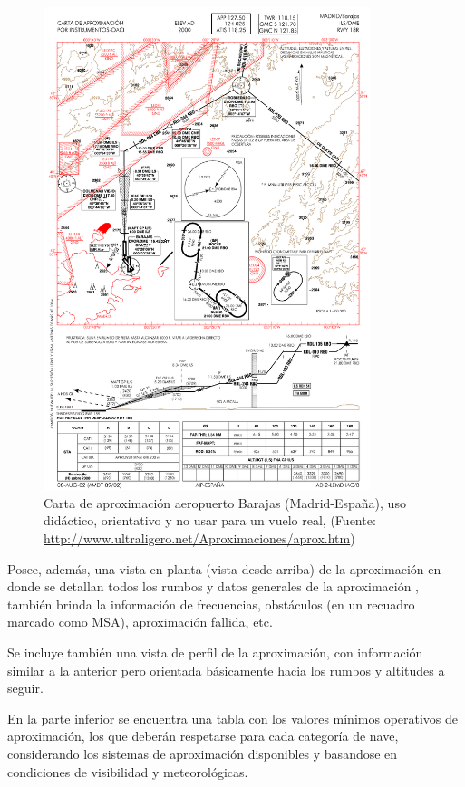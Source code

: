 \begin{figure}[!htb]
    \centering
    \includegraphics[width=0.85\textwidth]{Imagenes/06.00.navegacion/barajas18r_cropped.pdf}
    \caption{Carta de aproximaci\'on aeropuerto Barajas (Madrid-Espa\~na), uso
    did\'actico, orientativo y no usar para un vuelo real, (Fuente: \url{http://www.ultraligero.net/Aproximaciones/aprox.htm})}
    \label{fig:carta.aproximacion.instrumental.aeropuerto.barajas}
\end{figure}

Posee, adem\'as, una vista en planta (vista desde arriba) de la aproximaci\'on en
donde se detallan todos los rumbos y datos generales de la aproximaci\'on ,
tambi\'en brinda la informaci\'on de frecuencias, obst\'aculos (en un recuadro
marcado como MSA), aproximaci\'on fallida, etc.

Se incluye tambi\'en una vista de perfil de la aproximaci\'on, con informaci\'on
similar a la anterior pero orientada b\'asicamente hacia los rumbos y altitudes
a seguir.

En la parte inferior se encuentra una tabla con los valores m\'inimos operativos
de aproximaci\'on, los que deber\'an respetarse para cada categor\'ia de nave,
considerando los sistemas de aproximaci\'on disponibles y basandose en
condiciones de visibilidad y meteorol\'ogicas.

